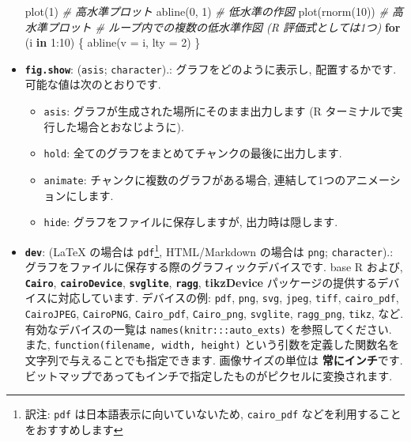 \documentclass[
  11pt,
  lualatex,ja=standard,jafont=noto]{bxjsreport}
\newenvironment{Shaded}{\begin{snugshade}}{\end{snugshade}}
\newcommand{\AttributeTok}[1]{\textcolor[rgb]{0.77,0.63,0.00}{#1}}
\newcommand{\CommentTok}[1]{\textcolor[rgb]{0.56,0.35,0.01}{\textit{#1}}}
\newcommand{\ControlFlowTok}[1]{\textcolor[rgb]{0.13,0.29,0.53}{\textbf{#1}}}
\newcommand{\DecValTok}[1]{\textcolor[rgb]{0.00,0.00,0.81}{#1}}
\newcommand{\FunctionTok}[1]{\textcolor[rgb]{0.00,0.00,0.00}{#1}}
\newcommand{\NormalTok}[1]{#1}
\newcommand{\SpecialCharTok}[1]{\textcolor[rgb]{0.00,0.00,0.00}{#1}}
\providecommand{\tightlist}{%
  \setlength{\itemsep}{0pt}\setlength{\parskip}{0pt}}
\begin{document}
\begin{itemize}
\begin{Shaded}
\begin{Highlighting}[numbers=left,,]
\FunctionTok{plot}\NormalTok{(}\DecValTok{1}\NormalTok{)  }\CommentTok{\# 高水準プロット}
\FunctionTok{abline}\NormalTok{(}\DecValTok{0}\NormalTok{, }\DecValTok{1}\NormalTok{)  }\CommentTok{\# 低水準の作図}
\FunctionTok{plot}\NormalTok{(}\FunctionTok{rnorm}\NormalTok{(}\DecValTok{10}\NormalTok{))  }\CommentTok{\# 高水準プロット}
\CommentTok{\# ループ内での複数の低水準作図 (R 評価式としては1つ)}
\ControlFlowTok{for}\NormalTok{ (i }\ControlFlowTok{in} \DecValTok{1}\SpecialCharTok{:}\DecValTok{10}\NormalTok{) \{}
  \FunctionTok{abline}\NormalTok{(}\AttributeTok{v =}\NormalTok{ i, }\AttributeTok{lty =} \DecValTok{2}\NormalTok{)}
\NormalTok{\}}
\end{Highlighting}
\end{Shaded}
\item
  \textbf{\texttt{fig.show}}: (\texttt{\textquotesingle{}asis\textquotesingle{}}; \texttt{character}).: グラフをどのように表示し, 配置するかです. 可能な値は次のとおりです.

  \begin{itemize}
  \tightlist
  \item
    \texttt{asis}: グラフが生成された場所にそのまま出力します (R ターミナルで実行した場合とおなじように).
  \item
    \texttt{hold}: 全てのグラフをまとめてチャンクの最後に出力します.
  \item
    \texttt{animate}: チャンクに複数のグラフがある場合, 連結して1つのアニメーションにします.
  \item
    \texttt{hide}: グラフをファイルに保存しますが, 出力時は隠します.
  \end{itemize}
\item
  \textbf{\texttt{dev}}: (LaTeX の場合は \texttt{\textquotesingle{}pdf\textquotesingle{}}\footnote{訳注: \texttt{pdf} は日本語表示に向いていないため, \texttt{cairo\_pdf} などを利用することをおすすめします}, HTML/Markdown の場合は \texttt{\textquotesingle{}png\textquotesingle{}}; \texttt{character}).: グラフをファイルに保存する際のグラフィックデバイスです. base R および, \textbf{\texttt{Cairo}}, \textbf{\texttt{cairoDevice}}, \textbf{\texttt{svglite}}, \textbf{\texttt{ragg}}, \textbf{tikzDevice} パッケージの提供するデバイスに対応しています. デバイスの例: \texttt{pdf}, \texttt{png}, \texttt{svg}, \texttt{jpeg}, \texttt{tiff}, \texttt{cairo\_pdf}, \texttt{CairoJPEG}, \texttt{CairoPNG}, \texttt{Cairo\_pdf}, \texttt{Cairo\_png}, \texttt{svglite}, \texttt{ragg\_png}, \texttt{tikz}, など. 有効なデバイスの一覧は \texttt{names(knitr:::auto\_exts)} を参照してください. また, \texttt{function(filename, width, height)} という引数を定義した関数名を文字列で与えることでも指定できます. 画像サイズの単位は \textbf{常にインチ}です. ビットマップであってもインチで指定したものがピクセルに変換されます.
\end{itemize}
\end{document}
